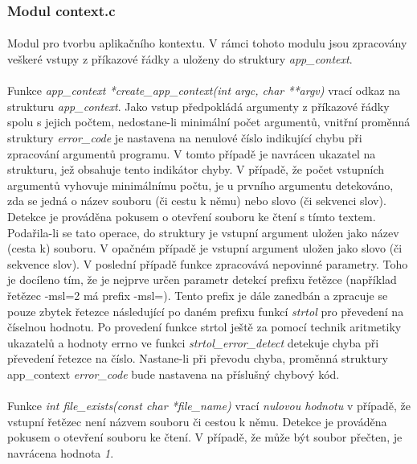 ﻿\documentclass[12pt, a4paper]{article}
\begin{document}
\subsubsection{Modul context.c}
\paragraph{}
Modul pro tvorbu aplikačního kontextu. V rámci tohoto modulu jsou zpracovány veškeré vstupy z příkazové řádky a uloženy do struktury \textit{app\_context}.

\paragraph{}
Funkce \textit{app\_context *create\_app\_context(int argc, char **argv)} vrací odkaz na strukturu \textit{app\_context}. Jako vstup předpokládá argumenty z příkazové řádky spolu s jejich počtem, nedostane-li minimální počet argumentů, vnitřní proměnná struktury \textit{error\_code} je nastavena na nenulové číslo indikující chybu při zpracování argumentů programu. V tomto případě je navrácen ukazatel na strukturu, jež obsahuje tento indikátor chyby. 
V případě, že počet vstupních argumentů vyhovuje minimálnímu počtu, je u prvního argumentu detekováno, zda se jedná o název souboru (či cestu k němu) nebo slovo (či sekvenci slov). Detekce je prováděna pokusem o otevření souboru ke čtení s tímto textem. Podařila-li se tato operace, do struktury je vstupní argument uložen jako název (cesta k) souboru. V opačném případě je vstupní argument uložen jako slovo (či sekvence slov). 
V poslední případě funkce zpracovává nepovinné parametry. Toho je docíleno tím, že je nejprve určen parametr detekcí prefixu řetězce (například řetězec -msl=2 má prefix -msl=). Tento prefix je dále zanedbán a zpracuje se pouze zbytek řetezce následující po daném prefixu funkcí \textit{strtol} pro převedení na číselnou hodnotu. Po provedení funkce strtol ještě za pomocí technik aritmetiky ukazatelů a hodnoty errno ve funkci \textit{strtol\_error\_detect} detekuje chyba při převedení řetezce na číslo. Nastane-li při převodu chyba, proměnná struktury app\_context \textit{error\_code} bude nastavena na příslušný chybový kód.

\paragraph{}
Funkce \textit{int file\_exists(const char *file\_name)} vrací \textit{nulovou hodnotu} v případě, že vstupní řetězec není názvem souboru či cestou k němu. Detekce je prováděna pokusem o otevření souboru ke čtení. V případě, že může být soubor přečten, je navrácena hodnota \textit{1}.
\end{document}
